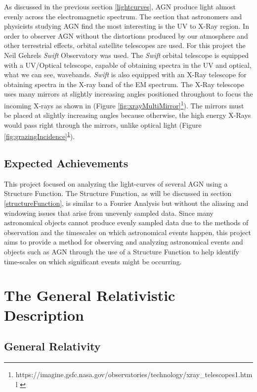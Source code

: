 \documentclass[12pt, oneside]{smuthesis}
\begin{document}
As discussed in the previous section \ref{lightcurves}, AGN produce light almost evenly across the electromagnetic spectrum. The section that astronomers and physicists studying AGN find the most interesting is the UV to X-Ray region. In order to observer AGN without the distortions produced by our atmosphere and other terrestrial effects, orbital satellite telescopes are used. For this project the Neil Gehrels \textit{Swift} Observatory was used. The \textit{Swift} orbital telescope is equipped with a UV/Optical telescope, capable of obtaining spectra in the UV and optical, what we can see, wavebands. \textit{Swift} is also equipped with an X-Ray telescope for obtaining spectra in the X-ray band of the EM spectrum. The X-Ray telescope uses many mirrors at slightly increasing angles positioned throughout to focus the incoming X-rays as shown in (Figure \ref{fig:xrayMultiMirror}\footnote{https://imagine.gsfc.nasa.gov/observatories/technology/xray\_telescopes1.html \label{xrayTelescopeRef}}). The mirrors must be placed at slightly increasing angles because otherwise, the high energy X-Rays would pass right through the mirrors, unlike optical light (Figure \ref{fig:grazingIncidence}\textsuperscript{\ref{xrayTelescopeRef}}).

\section{\sc Expected Achievements} \label{expectedAchievements}

This project focused on analyzing the light-curves of several AGN using a Structure Function. The Structure Function, as will be discussed in section \ref{structureFunction}, is similar to a Fourier Analysis but without the aliasing and windowing issues that arise from unevenly sampled data. Since many astronomical objects cannot produce evenly sampled data due to the methods of observation and the timescales on which astronomical events happen, this project aims to provide a method for observing and analyzing astronomical events and objects such as AGN through the use of a Structure Function to help identify time-scales on which significant events might be occurring.

\newpage

\chapter{\sc The General Relativistic Description} \label{GRDescription}

\section{\sc General Relativity} \label{generalRelativity}
\end{document}
